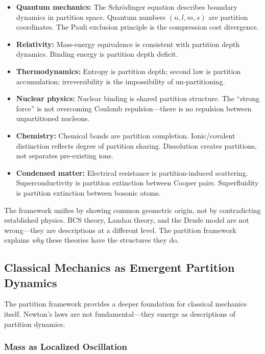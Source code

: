 \documentclass[twocolumn,10pt,a4paper]{article}
\theoremstyle{definition}
\theoremstyle{remark}
\begin{document}
\begin{itemize}
    \item \textbf{Quantum mechanics:} The Schr\"{o}dinger equation describes boundary dynamics in partition space. Quantum numbers $(n, l, m, s)$ are partition coordinates. The Pauli exclusion principle is the compression cost divergence.
    \item \textbf{Relativity:} Mass-energy equivalence is consistent with partition depth dynamics. Binding energy is partition depth deficit.
    \item \textbf{Thermodynamics:} Entropy is partition depth; second law is partition accumulation; irreversibility is the impossibility of un-partitioning.
    \item \textbf{Nuclear physics:} Nuclear binding is shared partition structure. The ``strong force'' is not overcoming Coulomb repulsion---there is no repulsion between unpartitioned nucleons.
    \item \textbf{Chemistry:} Chemical bonds are partition completion. Ionic/covalent distinction reflects degree of partition sharing. Dissolution creates partitions, not separates pre-existing ions.
    \item \textbf{Condensed matter:} Electrical resistance is partition-induced scattering. Superconductivity is partition extinction between Cooper pairs. Superfluidity is partition extinction between bosonic atoms.
\end{itemize}

The framework unifies by showing common geometric origin, not by contradicting established physics. BCS theory, Landau theory, and the Drude model are not wrong---they are descriptions at a different level. The partition framework explains \emph{why} these theories have the structures they do.

\subsection{Classical Mechanics as Emergent Partition Dynamics}

The partition framework provides a deeper foundation for classical mechanics itself. Newton's laws are not fundamental---they emerge as descriptions of partition dynamics.

\subsubsection{Mass as Localized Oscillation}
\end{document}

